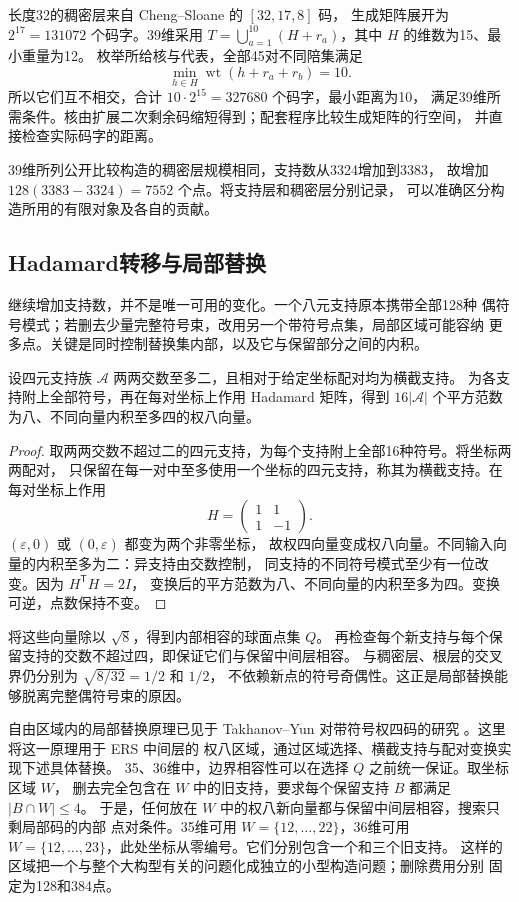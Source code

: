 长度32的稠密层来自 Cheng--Sloane 的 $[32,17,8]$ 码\cite{chengsloane}，
生成矩阵展开为 $2^{17}=131072$ 个码字。39维采用
$T=\bigcup_{a=1}^{10}(H+r_a)$，其中 $H$ 的维数为15、最小重量为12。
枚举所给核与代表，全部45对不同陪集满足
\[
\min_{h\in H}\operatorname{wt}(h+r_a+r_b)=10.
\]
所以它们互不相交，合计 $10\cdot2^{15}=327680$ 个码字，最小距离为10，
满足39维所需条件。核由扩展二次剩余码缩短得到；配套程序比较生成矩阵的行空间，
并直接检查实际码字的距离。

39维所列公开比较构造的稠密层规模相同，支持数从3324增加到3383，
故增加 $128(3383-3324)=7552$ 个点。将支持层和稠密层分别记录，
可以准确区分构造所用的有限对象及各自的贡献。

\subsection{Hadamard转移与局部替换}

继续增加支持数，并不是唯一可用的变化。一个八元支持原本携带全部128种
偶符号模式；若删去少量完整符号束，改用另一个带符号点集，局部区域可能容纳
更多点。关键是同时控制替换集内部，以及它与保留部分之间的内积。

\begin{proposition}[配对 Hadamard 转移]
\label{prop:hadamard}
设四元支持族 $\mathcal A$ 两两交数至多二，且相对于给定坐标配对均为横截支持。
为各支持附上全部符号，再在每对坐标上作用 Hadamard 矩阵，得到
$16|\mathcal A|$ 个平方范数为八、不同向量内积至多四的权八向量。
\end{proposition}
\begin{proof}
取两两交数不超过二的四元支持，为每个支持附上全部16种符号。将坐标两两配对，
只保留在每一对中至多使用一个坐标的四元支持，称其为横截支持。在每对坐标上作用
\[
H=\begin{pmatrix}1&1\\1&-1\end{pmatrix}.
\]
$(\varepsilon,0)$ 或 $(0,\varepsilon)$ 都变为两个非零坐标，
故权四向量变成权八向量。不同输入向量的内积至多为二：异支持由交数控制，
同支持的不同符号模式至少有一位改变。因为 $H^{\mathsf T}H=2I$，
变换后的平方范数为八、不同向量的内积至多为四。变换可逆，点数保持不变。
\end{proof}

将这些向量除以 $\sqrt8$，得到内部相容的球面点集 $Q$。
再检查每个新支持与每个保留支持的交数不超过四，即保证它们与保留中间层相容。
与稠密层、根层的交叉界仍分别为 $\sqrt{8/32}=1/2$ 和 $1/2$，
不依赖新点的符号奇偶性。这正是局部替换能够脱离完整偶符号束的原因。

自由区域内的局部替换原理已见于 Takhanov--Yun 对带符号权四码的研究
\cite[第V节，定义5与引理4]{signed-johnson}。这里将这一原理用于 ERS 中间层的
权八区域，通过区域选择、横截支持与配对变换实现下述具体替换。
35、36维中，边界相容性可以在选择 $Q$ 之前统一保证。取坐标区域 $W$，
删去完全包含在 $W$ 中的旧支持，要求每个保留支持 $B$ 都满足 $|B\cap W|\le4$。
于是，任何放在 $W$ 中的权八新向量都与保留中间层相容，搜索只剩局部码的内部
点对条件。35维可用 $W=\{12,\ldots,22\}$，36维可用
$W=\{12,\ldots,23\}$，此处坐标从零编号。它们分别包含一个和三个旧支持。
这样的区域把一个与整个大构型有关的问题化成独立的小型构造问题；删除费用分别
固定为128和384点。

